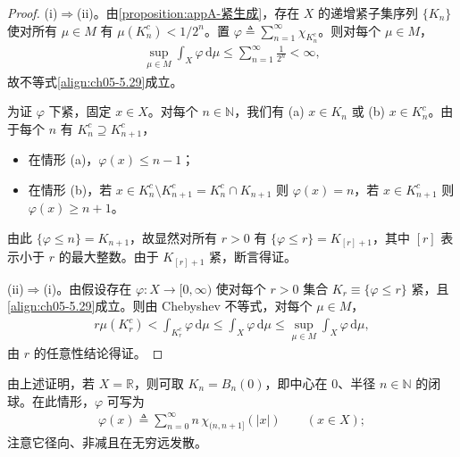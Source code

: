 \documentclass[../../main.tex]{subfiles}%
\begin{document}
\begin{proof}
(i)$\Rightarrow$(ii)。由\cref{proposition:appA-紧生成}，存在 $X$ 的递增紧子集序列 $\{K_n\}$ 使对所有 $\mu\in M$ 有 $\mu(K_n^c)<1/2^n$。置 $\varphi\triangleq \sum_{n=1}^\infty\chi_{K_n^c}$。则对每个 $\mu\in M$，
\begin{align*}
\sup_{\mu\in M}\int_X\varphi\,\mathrm{d}\mu
\leqslant\sum_{n=1}^\infty\frac{1}{2^n}<\infty,
\end{align*}
故不等式\eqref{align:ch05-5.29}成立。

为证 $\varphi$ 下紧，固定 $x\in X$。对每个 $n\in\mathbb{N}$，我们有 (a) $x\in K_n$ 或 (b) $x\in K_n^c$。由于每个 $n$ 有 $K_n^c\supseteq K_{n+1}^c$，
\begin{itemize}
\item 在情形 (a)，$\varphi(x)\leqslant n-1$；
\item 在情形 (b)，若 $x\in K_n^c\setminus K_{n+1}^c=K_n^c\cap K_{n+1}$ 则 $\varphi(x)=n$，若 $x\in K_{n+1}^c$ 则 $\varphi(x)\geqslant n+1$。
\end{itemize}
由此 $\{\varphi\leqslant n\}=K_{n+1}$，故显然对所有 $r>0$ 有 $\{\varphi\leqslant r\}=K_{[r]+1}$，其中 $[r]$ 表示小于 $r$ 的最大整数。由于 $K_{[r]+1}$ 紧，断言得证。

(ii)$\Rightarrow$(i)。由假设存在 $\varphi:X\to[0,\infty)$ 使对每个 $r>0$ 集合 $K_r\equiv\{\varphi\leqslant r\}$ 紧，且\eqref{align:ch05-5.29}成立。则由 Chebyshev 不等式，对每个 $\mu\in M$，
\begin{align*}
r\mu(K_r^c)<\int_{K_r^c}\varphi\,\mathrm{d}\mu
\leqslant\int_X\varphi\,\mathrm{d}\mu
\leqslant\sup_{\mu\in M}\int_X\varphi\,\mathrm{d}\mu,
\end{align*}
由 $r$ 的任意性结论得证。
\end{proof}

\begin{remark}\label{remark:ch05-径向下紧}
由上述证明，若 $X=\mathbb{R}$，则可取 $K_n=B_n(0)$，即中心在 $0$、半径 $n\in\mathbb{N}$ 的闭球。在此情形，$\varphi$ 可写为
\begin{align*}
\varphi(x)\triangleq \sum_{n=0}^\infty n\,\chi_{(n,n+1]}(|x|)\qquad(x\in X);
\end{align*}
注意它径向、非减且在无穷远发散。
\end{remark}
\end{document}

